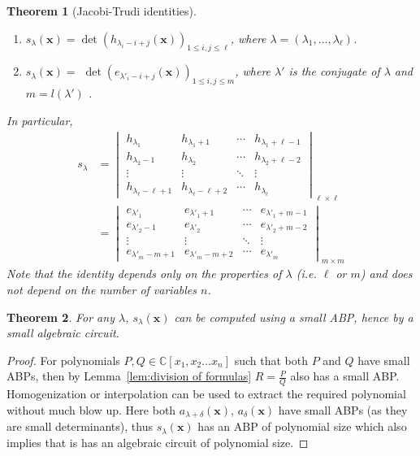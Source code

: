 \documentclass[10pt,a4paper]{article}
\newtheorem{theorem}{Theorem}
\theoremstyle{definition}
\newcommand{\vx}{\mathbf x}
\begin{document}
%
\begin{theorem}[Jacobi-Trudi identities] \label {thm:jacobi-trudi}  \leavevmode
	
	\begin{enumerate}
		\item[(1)] $s_\lambda(\vx)=\det(h_{\lambda_i -i+j}(\vx))_{1\leq i,j \leq \ell}$, where $\lambda= (\lambda_1, \ldots, \lambda_\ell)$.
		
		\item[(2)] $s_\lambda(\vx)=$ $\det(e_{\lambda'_i -i+j}(\vx))_{1\leq i,j \leq m}$,  where $\lambda'$ is the conjugate of $\lambda$ and $m= l(\lambda')$ . 
	\end{enumerate} 
	In particular, 
	\vspace{0.3cm}
\begin{align*}
s_\lambda &=  \begin{vmatrix}h_{\lambda_1}&h_{\lambda_1+1}&\cdots&h_{\lambda_1+\ell-1}\\h_{\lambda_2-1}&h_{\lambda_2}&\cdots&h_{\lambda_2+\ell-2}\\\vdots&\vdots&\ddots&\vdots\\h_{\lambda_\ell-\ell+1}&h_{\lambda_\ell-\ell+2}&\cdots&h_{\lambda_\ell}\end{vmatrix}_{\ell \times \ell} \\
	&= \begin{vmatrix}e_{\lambda'_1}&e_{\lambda'_1+1}&\cdots&e_{\lambda'_1+m-1}\\e_{\lambda'_2-1}&e_{\lambda'_2}&\cdots&e_{\lambda'_2+m-2}\\\vdots&\vdots&\ddots&\vdots\\e_{\lambda'_m-m+1}&e_{\lambda'_m-m+2}&\cdots&e_{\lambda'_m}\end{vmatrix}_{m\times m}
\end{align*}
Note that the identity depends only on the properties of $\lambda$ (i.e. $\ell$ or $m$) and does not depend on the number of variables $n$. 
\end{theorem}

%
\begin{theorem}
For any $\lambda$, $s_\lambda(\vx)$ can be computed using a small ABP, hence by a small algebraic circuit.
\end{theorem} 

\begin{proof}
For polynomials $P,Q \in \mathbb{C}[x_1,x_2 \ldots x_n]$ such that both $P$ and $Q$ have small ABPs, then by Lemma~\ref{lem:division of formulas} $R=\frac{P}{Q}$ also has a small ABP. Homogenization or interpolation can be used to extract the required polynomial without much blow up. Here both $a_{\lambda+\delta}(\vx)$, $a_\delta(\vx)$ have small ABPs (as they are small determinants), thus $s_\lambda(\vx)$ has an ABP of polynomial size which also implies that is has an algebraic circuit of polynomial size.
\end{proof}
\end{document}
